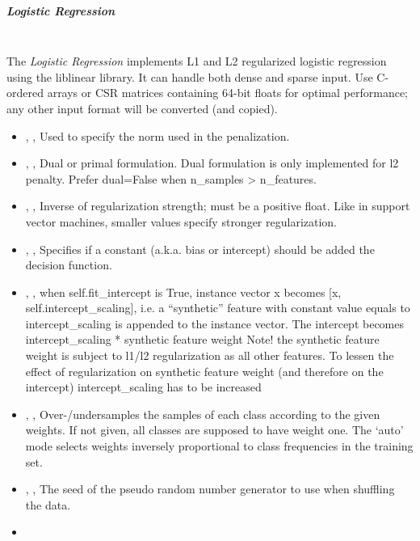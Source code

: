 \subparagraph{Logistic Regression }
\mbox{}
\\The \textit{Logistic Regression} implements L1 and L2 regularized logistic
regression using the liblinear library.
%
It can handle both dense and sparse input.
%
Use C-ordered arrays or CSR matrices containing 64-bit floats for optimal
performance; any other input format will be converted (and copied).
%
\begin{itemize}
  \item {} , ,
  Used to specify the norm used in the penalization.
  \item {} , ,
  Dual or primal formulation.
  Dual formulation is only implemented for l2 penalty.
  Prefer dual=False when n\_samples > n\_features.
  \item {} , ,
  Inverse of regularization strength; must be a positive float.
  Like in support vector machines, smaller values specify stronger
  regularization.
  \item {} , ,
  Specifies if a constant (a.k.a.
  bias or intercept) should be added the decision function.
  \item {} , ,
  when self.fit\_intercept is True, instance vector x becomes [x,
  self.intercept\_scaling], i.e. a “synthetic” feature with
  constant value equals to intercept\_scaling is appended to the
  instance vector.
  The intercept becomes intercept\_scaling * synthetic feature
  weight Note! the synthetic feature weight is subject to l1/l2 regularization
  as all other features.
  To lessen the effect of regularization on synthetic feature weight (and
  therefore on the intercept) intercept\_scaling has to be
  increased
  \item {} , ,
  Over-/undersamples the samples of each class according to the given weights.
  If not given, all classes are supposed to have weight one.
  The ‘auto’ mode selects weights inversely proportional to class
  frequencies in the training set.
  \item {} , ,
  The seed of the pseudo random number generator to use when shuffling the data.
  \item \tolDescriptionC{}
\end{itemize}

